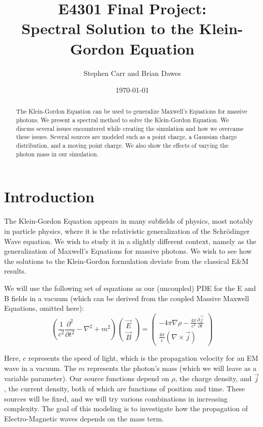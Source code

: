 \documentclass{article}
\begin{document}
	\title{E4301 Final Project:\\Spectral Solution to the Klein-Gordon Equation}
	\author{Stephen Carr and Brian Dawes}
	\date{\today}
	\maketitle
	
	\begin{abstract}
		The Klein-Gordon Equation can be used to generalize Maxwell's Equations for massive photons. We present a spectral method to solve the Klein-Gordon Equation. We discuss several issues encountered while creating the simulation and how we overcame these issues. Several sources are modeled such as a point charge, a Gaussian charge distribution, and a moving point charge. We also show the effects of varying the photon mass in our simulation. 
	\end{abstract}
	
	\section{Introduction}
	
	
	The Klein-Gordon Equation appears in many subfields of physics, most notably in particle physics, where it is the relativistic generalization of the Schr\"odinger Wave equation. We wish to study it in a slightly different context, namely as the generalization of Maxwell's Equations for massive photons. We wish to see how the solutions to the Klein-Gordon formulation deviate from the classical E\&M results.
	
	We will use the following set of equations as our (uncoupled) PDE for the E and B fields in a vacuum (which can be derived from the coupled Massive Maxwell Equations, omitted here):
	\begin{equation}
	\boxed{
		\left(\frac{1}{c^2}\frac{\partial^2}{\partial t^2} - \nabla^2 + m^2\right)
		\begin{pmatrix}
		\vec{E} \\
		\vec{B}
		\end{pmatrix}
		=
		\begin{pmatrix}
		-4\pi\nabla\rho - \frac{4\pi}{c^2}\frac{\partial\vec{j}}{\partial t} \\
		\frac{4\pi}{c}(\nabla\times\vec{j})
		\end{pmatrix}
	}
	\end{equation}
	
	Here, $c$ represents the speed of light, which is the propagation velocity for an EM wave in a vacuum. The $m$ represents the photon's mass (which we will leave as a variable parameter). Our source functions depend on $\rho$, the charge density, and $\vec{j}$, the current density, both of which are functions of position and time. These sources will be fixed, and we will try various combinations in increasing complexity. The goal of this modeling is to investigate how the propagation of Electro-Magnetic waves depends on the mass term.
	
\end{document}

